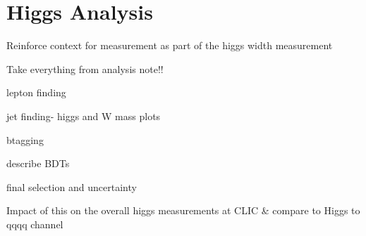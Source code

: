 \chapter{Higgs Analysis}

Reinforce context for measurement as part of the higgs width measurement

Take everything from analysis note!!

lepton finding

jet finding- higgs and W mass plots

btagging

describe BDTs

final selection and uncertainty

Impact of this on the overall higgs measurements at CLIC \& compare to Higgs to qqqq channel